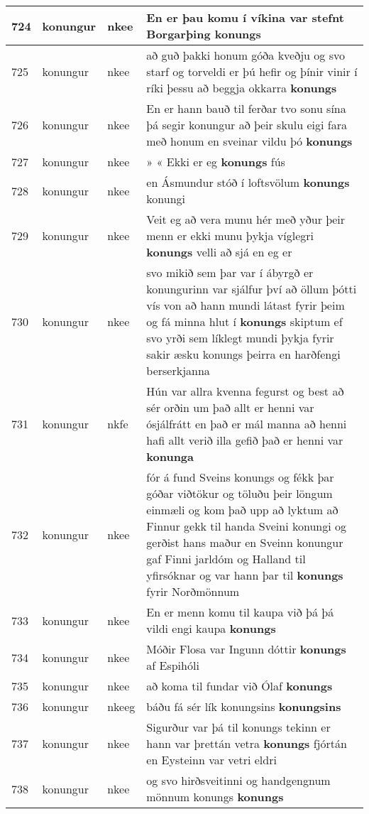 \documentclass{article}
\begin{document}
\begin{longtable}{p{1cm}|p{1cm}|p{1cm}|p{13cm}}
\hline
724&konungur&nkee&En er þau komu í víkina var stefnt Borgarþing \textbf{konungs} \\
\hline
725&konungur&nkee&að guð þakki honum góða kveðju og svo starf og torveldi er þú hefir og þínir vinir í ríki þessu að beggja okkarra \textbf{konungs} \\
\hline
726&konungur&nkee&En er hann bauð til ferðar tvo sonu sína þá segir konungur að þeir skulu eigi fara með honum en sveinar vildu þó \textbf{konungs} \\
\hline
727&konungur&nkee&» « Ekki er eg \textbf{konungs} fús\\
\hline
728&konungur&nkee&en Ásmundur stóð í loftsvölum \textbf{konungs} konungi\\
\hline
729&konungur&nkee&Veit eg að vera munu hér með yður þeir menn er ekki munu þykja víglegri \textbf{konungs} velli að sjá en eg er\\
\hline
730&konungur&nkee&svo mikið sem þar var í ábyrgð er konungurinn var sjálfur því að öllum þótti vís von að hann mundi látast fyrir þeim og fá minna hlut í \textbf{konungs} skiptum ef svo yrði sem líklegt mundi þykja fyrir sakir æsku konungs þeirra en harðfengi berserkjanna\\
\hline
731&konungur&nkfe&Hún var allra kvenna fegurst og best að sér orðin um það allt er henni var ósjálfrátt en það er mál manna að henni hafi allt verið illa gefið það er henni var \textbf{konunga} \\
\hline
732&konungur&nkee&fór á fund Sveins konungs og fékk þar góðar viðtökur og töluðu þeir löngum einmæli og kom það upp að lyktum að Finnur gekk til handa Sveini konungi og gerðist hans maður en Sveinn konungur gaf Finni jarldóm og Halland til yfirsóknar og var hann þar til \textbf{konungs} fyrir Norðmönnum\\
\hline
733&konungur&nkee&En er menn komu til kaupa við þá þá vildi engi kaupa \textbf{konungs} \\
\hline
734&konungur&nkee&Móðir Flosa var Ingunn dóttir \textbf{konungs} af Espihóli\\
\hline
735&konungur&nkee&að koma til fundar við Ólaf \textbf{konungs} \\
\hline
736&konungur&nkeeg&báðu fá sér lík konungsins \textbf{konungsins} \\
\hline
737&konungur&nkee&Sigurður var þá til konungs tekinn er hann var þrettán vetra \textbf{konungs} fjórtán en Eysteinn var vetri eldri\\
\hline
738&konungur&nkee&og svo hirðsveitinni og handgengnum mönnum konungs \textbf{konungs} \\

\end{longtable}
\end{document}
